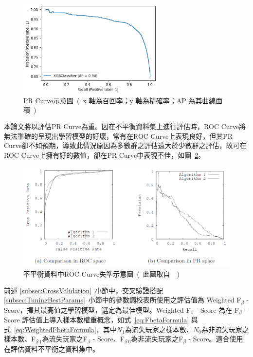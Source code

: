 \begin{figure}[!htb]
    \begin{center}
      \includegraphics[width=0.65\textwidth]{figures/evaluation/Image_PRCurve.png}
      \caption[PR Curve示意圖]{PR Curve示意圖\ (\ x 軸為召回率；y 軸為精確率；AP 為其曲線面積\ )}
      \label{fig:eva_PRCurve}
    \end{center}
\end{figure}

本論文將以評估PR Curve為重。因在不平衡資料集上進行評估時，ROC Curve將無法準確的呈現出學習模型的好壞，常有在ROC Curve上表現良好，但其PR Curve卻不如預期，導致此情況原因為多數群之評估遠大於少數群之評估，故可在ROC Curve上擁有好的數值，卻在PR Curve中表現不佳\cite{davis2006relationship}，如圖~\ref{fig:eva_GoodROCBadPR}。

\begin{figure}[!htb]
    \begin{center}
      \includegraphics[width=1\textwidth]{figures/evaluation/Image_GoodROCBadPR.png}
      \caption[不平衡資料中ROC Curve失準示意圖]{不平衡資料中ROC Curve失準示意圖\ (\ 此圖取自~\cite{davis2006relationship}\ )}
      \label{fig:eva_GoodROCBadPR}
    \end{center}
\end{figure}

前述 \ref{subsec:CrossValidation}~小節中，交叉驗證搭配 \ref{subsec:TuningBestParams}~小節中的參數調校表所使用之評估值為 Weighted F$_{\beta}$ - Score，擇其最高值之學習模型，選定為最佳模型。Weighted F$_{\beta}$ - Score 為在 F$_{\beta}$ - Score 評估值上導入樣本數權重概念，如式~\ref{eq:FbetaFormula} 與式~\ref{eq:WeightedFbetaFormula}，其中$N_1$為流失玩家之樣本數、$N_0$為非流失玩家之樣本數、F$_{\beta\ 1}$為流失玩家之F$_{\beta}$ - Score、F$_{\beta\ 0}$為非流失玩家之F$_{\beta}$ - Score。適合使用在評估資料不平衡之資料集中。

